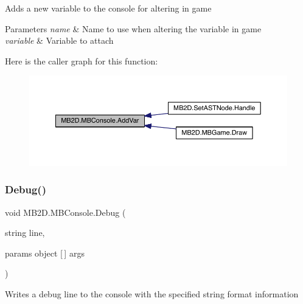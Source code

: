 Adds a new variable to the console for altering in game 


\begin{DoxyParams}{Parameters}
{\em name} & Name to use when altering the variable in game\\
\hline
{\em variable} & Variable to attach\\
\hline
\end{DoxyParams}
Here is the caller graph for this function\+:\nopagebreak
\begin{figure}[H]
\begin{center}
\leavevmode
\includegraphics[width=350pt]{class_m_b2_d_1_1_m_b_console_aeff7888e763a415aeccadc347e09828d_icgraph}
\end{center}
\end{figure}
\hypertarget{class_m_b2_d_1_1_m_b_console_a6f0c0f179b2fef32a130a5e1d4957a70}{}\label{class_m_b2_d_1_1_m_b_console_a6f0c0f179b2fef32a130a5e1d4957a70} 
\subsubsection{\texorpdfstring{Debug()}{Debug()}\hspace{0.1cm}{\footnotesize\ttfamily [1/4]}}
{\footnotesize\ttfamily void M\+B2\+D.\+M\+B\+Console.\+Debug (\begin{DoxyParamCaption}\item[{string}]{line,  }\item[{params object \mbox{[}$\,$\mbox{]}}]{args }\end{DoxyParamCaption})\hspace{0.3cm}{\ttfamily [inline]}}



Writes a debug line to the console with the specified string format information 


